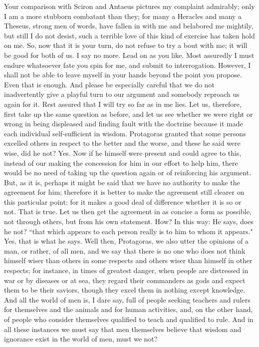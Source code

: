\documentclass[letterpaper,12pt]{article}
\newcommand{\stephpag}[1]{\marginnote{\small\itshape\fontfamily{ppl}\selectfont #1}}
\begin{document}
\begin{drama}
\socratesspeaks
Your comparison with Sciron and Antaeus pictures my complaint admirably; only I am a more stubborn combatant than they; for many a Heracles and many a Theseus, strong men of words, have fallen in with me and belabored me mightily, but still I do not desist, such a terrible love \stephpag{c} of this kind of exercise has taken hold on me. So, now that it is your turn, do not refuse to try a bout with me; it will be good for both of us.
\theodorusspeaks
I say no more. Lead on as you like. Most assuredly I must endure whatsoever fate you spin for me, and submit to interrogation. However, I shall not be able to leave myself in your hands beyond the point you propose.
\socratesspeaks
Even that is enough. And please be especially careful that we do not inadvertently give a playful turn \stephpag{d} to our argument and somebody reproach us again for it.
\theodorusspeaks
Rest assured that I will try so far as in me lies.
\socratesspeaks
Let us, therefore, first take up the same question as before, and let us see whether we were right or wrong in being displeased and finding fault with the doctrine because it made each individual self-sufficient in wisdom. Protagoras granted that some persons excelled others in respect to the better and the worse, and these he said were wise, did he not?
\theodorusspeaks
Yes.
\socratesspeaks
Now if he himself were present and could agree to this, instead of \stephpag{e} our making the concession for him in our effort to help him, there would be no need of taking up the question again or of reinforcing his argument. But, as it is, perhaps it might be said that we have no authority to make the agreement for him; therefore it is better to make the agreement still clearer on this particular point; for it makes a good deal of difference whether it is so or not.
\theodorusspeaks
That is true.
\socratesspeaks
Let us then get the agreement in as concise a form as possible, not through others, \stephpag{170 a} but from his own statement.
\theodorusspeaks
How?
\socratesspeaks
In this way: He says, does he not? ``that which appears to each person really is to him to whom it appears."
\theodorusspeaks
Yes, that is what he says.
\socratesspeaks
Well then, Protagoras, we also utter the opinions of a man, or rather, of all men, and we say that there is no one who does not think himself wiser than others in some respects and others wiser than himself in other respects; for instance, in times of greatest danger, when people are distressed in war or by diseases or at sea, they regard their commanders as gods and expect them to be their saviors, \stephpag{b} though they excel them in nothing except knowledge. And all the world of men is, I dare say, full of people seeking teachers and rulers for themselves and the animals and for human activities, and, on the other hand, of people who consider themselves qualified to teach and qualified to rule. And in all these instances we must say that men themselves believe that wisdom and ignorance exist in the world of men, must we not?

\end{drama}
\end{document}
